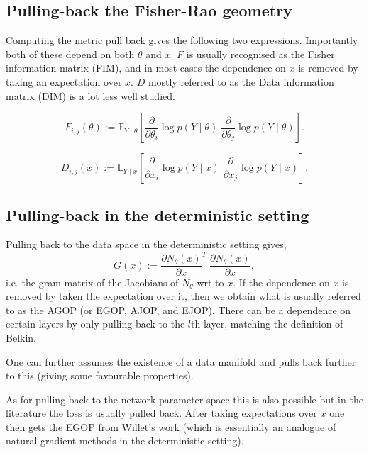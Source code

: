 \documentclass{tufte-handout}
\begin{document}
\subsection{Pulling-back the Fisher-Rao geometry}

Computing the metric pull back gives the following two expressions. Importantly both of these depend on both $\theta$ and $x$. $F$ is usually recognised as the Fisher information matrix (FIM), and in most cases the dependence on $x$ is removed by taking an expectation over $x$. $D$ mostly referred to as the Data information matrix (DIM) is a lot less well studied\cite{Grementieri2022,Tron2025}.

\begin{equation}
F_{i,j}(\theta)
:=
\mathbb{E}_{Y \mid \theta}
\left[
\frac{\partial}{\partial \theta_i} \log p(Y \mid \theta)
\;
\frac{\partial}{\partial \theta_j} \log p(Y \mid \theta)
\right].
\end{equation}

\begin{equation}
D_{i,j}(x)
:=
\mathbb{E}_{Y \mid x}
\left[
\frac{\partial}{\partial x_i} \log p(Y \mid x)
\;
\frac{\partial}{\partial x_j} \log p(Y \mid x)
\right].
\end{equation}

\subsection{Pulling-back in the deterministic setting}

Pulling back to the data space in the deterministic setting gives,
\begin{equation}
G(x)
:=
\frac{\partial N_\theta(x)}{\partial x}^T
\;
\frac{\partial N_\theta(x)}{\partial x},
\end{equation}
i.e. the gram matrix of the Jacobians of $N_\theta$ wrt to $x$. If the dependence on $x$ is removed by taken the expectation over it, then we obtain what is usually referred to as the AGOP (or EGOP, AJOP, and EJOP). There can be a dependence on certain layers by only pulling back to the $l$th layer, matching the definition of Belkin\cite{Radhakrishnan2024}.

One can further assumes the existence of a data manifold and pulls back further to this (giving some favourable properties).

As for pulling back to the network parameter space this is also possible but in the literature the loss is usually pulled back. After taking expectations over $x$ one then gets the EGOP from Willet's work\cite{DePavia2025} (which is essentially an analogue of natural gradient methods in the deterministic setting).
\end{document}
